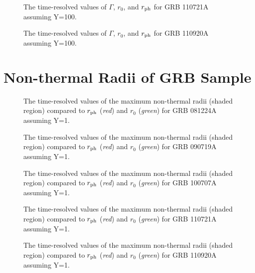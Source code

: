 \begin{figure}[tp]
  \centering
  \caption{The time-resolved values of $\Gamma$, $r_0$, and $r_{\rm ph}$ for GRB 110721A assuming Y=100.}
  \label{fig:ski4}
\end{figure}


\begin{figure}[tp]
  \centering
  \caption{The time-resolved values of $\Gamma$, $r_0$, and $r_{\rm ph}$ for GRB 110920A assuming Y=100.}
  \label{fig:ski5}
\end{figure}

\section{Non-thermal Radii of GRB Sample}

\begin{figure}[tp]
  \centering
  \caption{The time-resolved values of the maximum non-thermal radii (shaded region) compared to $r_{\rm ph}$ (\emph{red}) and $r_{0}$ (\emph{green}) for GRB 081224A assuming Y=1.}
  \label{fig:RNT1}
\end{figure}


\begin{figure}[tp]
  \centering
  \caption{The time-resolved values of the maximum non-thermal radii (shaded region) compared to $r_{\rm ph}$ (\emph{red}) and $r_{0}$ (\emph{green}) for GRB 090719A assuming Y=1.}
  \label{fig:RNT2}
\end{figure}

\begin{figure}[tp]
  \centering
  \caption{The time-resolved values of the maximum non-thermal radii (shaded region) compared to $r_{\rm ph}$ (\emph{red}) and $r_{0}$ (\emph{green}) for GRB 100707A assuming Y=1.}
  \label{fig:RNT3}
\end{figure}


\begin{figure}[tp]
  \centering
  \caption{The time-resolved values of the maximum non-thermal radii (shaded region) compared to $r_{\rm ph}$ (\emph{red}) and $r_{0}$ (\emph{green}) for GRB 110721A assuming Y=1.}
  \label{fig:RNT4}
\end{figure}


\begin{figure}[tp]
  \centering
  \caption{The time-resolved values of the maximum non-thermal radii (shaded region) compared to $r_{\rm ph}$ (\emph{red}) and $r_{0}$ (\emph{green}) for GRB 110920A assuming Y=1.}
  \label{fig:RNT5}
\end{figure}

